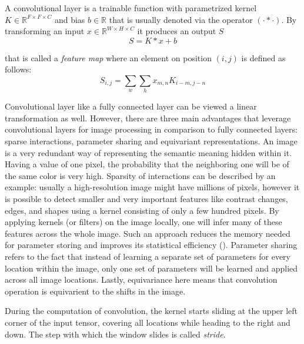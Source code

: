 \begin{definition}
	A convolutional layer is a trainable function with parametrized kernel $K \in \mathbb{R}^{F \times F \times C}$ and bias $b \in \mathbb{R}$ that is usually denoted via the operator $(\cdot * \cdot)$. By transforming an input $x \in \mathbb{R}^{W \times H \times C}$ it produces an output $S$
	\begin{equation}
		S = K * x + b
	\end{equation}

	that is called a \textit{feature map} where an element on position $(i, j)$ is defined as follows:
		\begin{equation}
			S_{i, j} = \sum_{w} \sum_{h} x_{m, n}  K_{i - m, j - n}
		\end{equation}
\end{definition}

Convolutional layer like a fully connected layer can be viewed a linear transformation as well. However, there are three main advantages that leverage convolutional layers for image processing in comparison to fully connected layers: sparse interactions, parameter sharing and equivariant representations. An image is a very redundant way of representing the semantic meaning hidden within it. Having a value of one pixel, the probability that the neighboring one will be of the same color is very high. Sparsity of interactions can be described by an example: usually a high-resolution image might have millions of pixels, however it is possible to detect smaller and very important features like contrast changes, edges, and shapes using a kernel consisting of only a few hundred pixels. By applying kernels (or filters) on the image locally, one will infer many of these features across the whole image. Such an approach reduces the memory needed for parameter storing and improves its statistical eﬃciency (\cite{Goodfellow_2016}). Parameter sharing refers to the fact that instead of learning a separate set of parameters for every location within the image, only one set of parameters will be learned and applied across all image locations. Lastly, equivariance here means that convolution operation is equivarient to the shifts in the image.

\begin{definition}[Stride]
	During the computation of convolution, the kernel starts sliding at the upper left corner of the input tensor, covering all locations while heading to the right and down. The step with which the window slides is called \textit{stride}. 
\end{definition}

